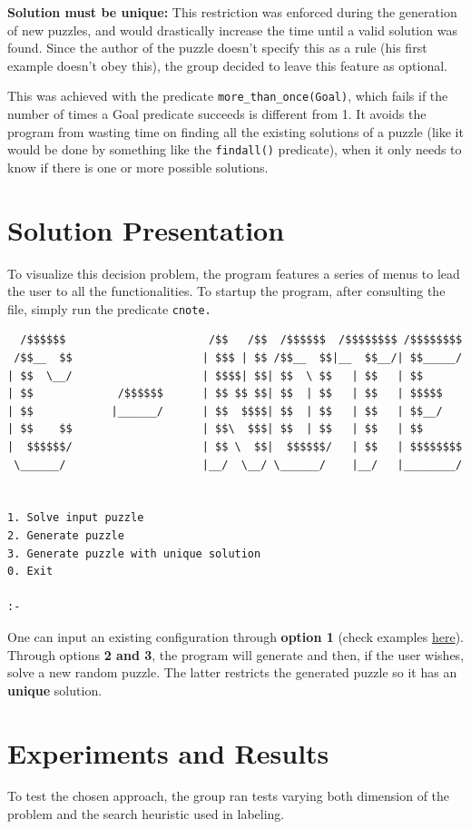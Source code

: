 \documentclass[runningheads]{llncs}
\begin{document}
\textbf{Solution must be unique:} This restriction was enforced during the generation of new puzzles, and would drastically increase the time until a valid solution was found. Since the author of the puzzle doesn't specify this as a rule (his first example doesn't obey this), the group decided to leave this feature as optional.

This was achieved with the predicate \verb!more_than_once(Goal)!, \cite{ref-more} which fails if the number of times a Goal predicate succeeds is different from 1. It avoids the program from wasting time on finding all the existing solutions of a puzzle (like it would be done by something like the \verb!findall()! predicate), when it only needs to know if there is one or more possible solutions.

\newpage
\section{Solution Presentation}
To visualize this decision problem, the program features a series of menus to lead the user to all the functionalities. To startup the program, after consulting the file, simply run the predicate \verb!cnote.!
\begin{verbatim}
  /$$$$$$                      /$$   /$$  /$$$$$$  /$$$$$$$$ /$$$$$$$$
 /$$__  $$                    | $$$ | $$ /$$__  $$|__  $$__/| $$_____/
| $$  \__/                    | $$$$| $$| $$  \ $$   | $$   | $$      
| $$             /$$$$$$      | $$ $$ $$| $$  | $$   | $$   | $$$$$   
| $$            |______/      | $$  $$$$| $$  | $$   | $$   | $$__/   
| $$    $$                    | $$\  $$$| $$  | $$   | $$   | $$      
|  $$$$$$/                    | $$ \  $$|  $$$$$$/   | $$   | $$$$$$$$
 \______/                     |__/  \__/ \______/    |__/   |________/


1. Solve input puzzle
2. Generate puzzle
3. Generate puzzle with unique solution
0. Exit

:- 
\end{verbatim}

One can input an existing configuration through \textbf{option 1} (check examples \href{https://erich-friedman.github.io/puzzle/100/}{here}).
Through options \textbf{2 and 3}, the program will generate and then, if the user wishes, solve a new random puzzle. The latter restricts the generated puzzle so it has an \textbf{unique} solution.

\section{Experiments and Results}
To test the chosen approach, the group ran tests varying both dimension of the problem and the search heuristic used in labeling.
\end{document}
